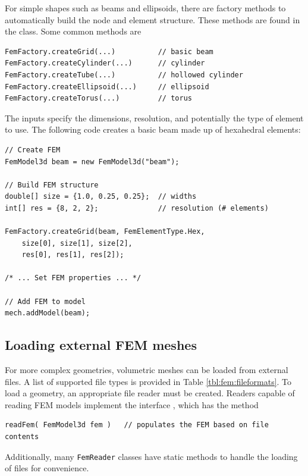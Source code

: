 For simple shapes such as beams and ellipsoids, there are factory methods to 
automatically build the node and element structure.  These methods are found
in the  class.  Some common
methods are
\begin{lstlisting}[]
FemFactory.createGrid(...)          // basic beam
FemFactory.createCylinder(...)      // cylinder
FemFactory.createTube(...)          // hollowed cylinder
FemFactory.createEllipsoid(...)     // ellipsoid
FemFactory.createTorus(...)         // torus
\end{lstlisting}
The inputs specify the dimensions, resolution, and potentially the type
of element to use.  The following code creates a basic beam made up of
hexahedral elements:
\begin{lstlisting}[]
// Create FEM
FemModel3d beam = new FemModel3d("beam");
      
// Build FEM structure
double[] size = {1.0, 0.25, 0.25};  // widths
int[] res = {8, 2, 2};              // resolution (# elements)
      
FemFactory.createGrid(beam, FemElementType.Hex,
	size[0], size[1], size[2], 
	res[0], res[1], res[2]);

/* ... Set FEM properties ... */

// Add FEM to model
mech.addModel(beam);
\end{lstlisting}

\subsection{Loading external FEM meshes}

For more complex geometries, volumetric meshes can be loaded from external
files.  A list of supported file types is provided in Table 
\ref{tbl:fem:fileformats}. To load a geometry, an appropriate file reader
must be created.  Readers capable of reading FEM models implement the 
interface , which has the
method
\begin{lstlisting}[]
readFem( FemModel3d fem )   // populates the FEM based on file contents
\end{lstlisting}
Additionally, many {\tt FemReader} classes have static methods to handle
the loading of files for convenience.

